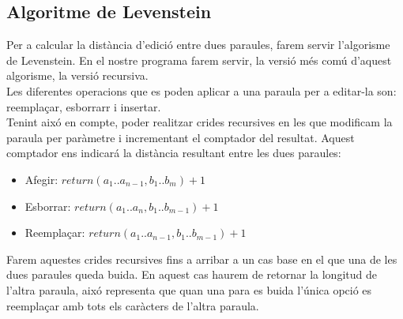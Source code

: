 \documentclass[conference]{IEEEtran}
\begin{document}
    \subsection{Algoritme de Levenstein}
    Per a calcular la distància d'edició entre dues paraules, farem servir l'algorisme de Levenstein. En el nostre programa farem servir, la versió més comú d'aquest algorisme, la versió recursiva.\\

    Les diferentes operacions que es poden aplicar a una paraula per a editar-la son: reemplaçar, esborrarr i insertar.\\
    Tenint aixó en compte, poder realitzar crides recursives en les que modificam la paraula per paràmetre i incrementant el comptador del resultat. Aquest comptador ens indicará la distància resultant entre les dues paraules:
    \begin{itemize}
        \item Afegir: $return  (a_1..a_{n-1}, b_1..b_m) + 1$
        \item Esborrar: $return (a_1..a_n, b_1..b_{m-1}) + 1$
        \item Reemplaçar: $return (a_1..a_{n-1}, b_1..b_{m-1}) + 1$
    \end{itemize}

    
    Farem aquestes crides recursives fins a arribar a un cas base en el que una de les dues paraules queda buida. En aquest cas haurem de retornar la longitud de l'altra paraula, aixó representa que quan una para es buida l'única opció es reemplaçar amb tots els caràcters de l'altra paraula.\\
\end{document}
